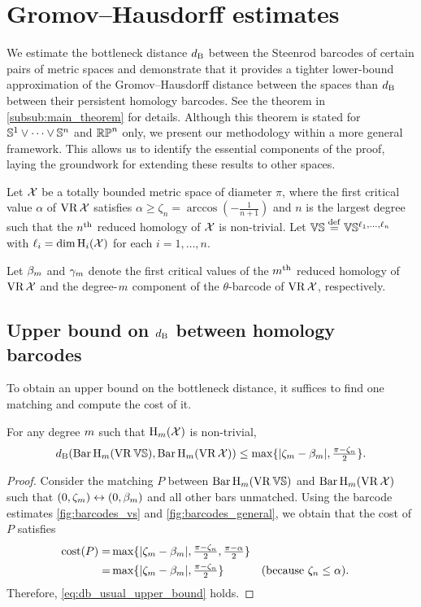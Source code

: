 
\section{Gromov--Hausdorff estimates}\label{prop:db estimate}

We estimate the bottleneck distance $\db$ between the Steenrod barcodes of certain pairs of metric spaces and demonstrate that it provides a tighter lower-bound approximation of the Gromov–Hausdorff distance between the spaces than $\db$ between their persistent homology barcodes.
See the theorem in \cref{subsub:main_theorem} for details.
Although this theorem is stated for $\bS^1\vee\dots\vee \bS^n$ and $\rp^n$ only, we present our methodology within a more general framework.
This allows us to identify the essential components of the proof, laying the groundwork for extending these results to other spaces.

Let $\cX$ be a totally bounded metric space of diameter $\pi$, where the first critical value $\alpha$ of $\VR\cX$ satisfies $\alpha \geq \zeta_n = \arccos{(-\tfrac{1}{n+1})}$ and $n$ is the largest degree such that the $n^\th$ reduced homology of $\cX$ is non-trivial.
Let $\VS \defeq \VS^{\ell_1, \dots, \ell_n}$ with $\ell_i = \dim \opH_i(\cX)$ for each $i=1, \dots, n$.

Let $\beta_\degp$ and $\gamma_\degp$ denote the first critical values of the $\degp^\th$ reduced homology of $\VR\cX$ and the degree-$\degp$ component of the $\theta$-barcode of $\VR\cX$, respectively.

\subsection{Upper bound on $\db$ between homology barcodes}
\label{subsub:db_upper_bound}

To obtain an upper bound on the bottleneck distance, it suffices to find one matching and compute the cost of it.

\medskip\proposition
For any degree $\degp$ such that $\opH_\degp(\cX)$ is non-trivial,
\begin{equation}\label{eq:db_usual_upper_bound}
	\db(\Hbarc[\field]{\degp}{\VS}, \Hbarc[\field]{\degp}{\cX})
	\leq \max\{|\zeta_\degp  - \beta_\degp |, \tfrac{\pi - \zeta_n}{2}\}.
\end{equation}

\begin{proof}
	Consider the matching $P$ between $\Hbarc[\field]{\degp}{\VS}$ and $\Hbarc[\field]{\degp}{\cX}$ such that $(0,\zeta_\degp ) \leftrightarrow (0, \beta_\degp )$ and all other bars unmatched.
	Using the barcode estimates \cref{fig:barcodes_vs} and \cref{fig:barcodes_general}, we obtain that the cost of $P$ satisfies
	\begin{align*}
		\cost(P)
		= & \max\{|\zeta_\degp  - \beta_\degp |, \tfrac{\pi - \zeta_n}{2}, \tfrac{\pi - \alpha}{2}\} \\
		= & \max\{|\zeta_\degp  - \beta_\degp |, \tfrac{\pi - \zeta_n}{2}\} && \mbox{(because $\zeta_n \leq \alpha$)}.
	\end{align*}
	Therefore, \cref{eq:db_usual_upper_bound} holds.
\end{proof}


